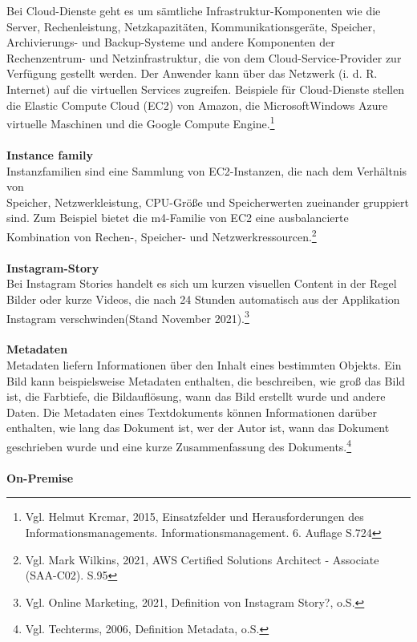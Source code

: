 Bei Cloud-Dienste geht es um sämtliche
Infrastruktur-Komponenten wie die Server, Rechenleistung, Netzkapazitäten, Kommunikationsgeräte, Speicher, Archivierungs- und Backup-Systeme und andere Komponenten der Rechenzentrum- und Netzinfrastruktur, die von dem Cloud-Service-Provider zur Verfügung gestellt werden. Der Anwender kann über das Netzwerk (i. d. R. Internet) auf die virtuellen Services zugreifen. Beispiele für Cloud-Dienste stellen die Elastic Compute Cloud (EC2) von Amazon, die MicrosoftWindows Azure virtuelle Maschinen und die Google Compute Engine.\footnote{Vgl. Helmut Krcmar, 2015, Einsatzfelder und Herausforderungen des Informationsmanagements. Informationsmanagement. 6. Auflage S.724\cite{IM1}}
\\\\
\textbf{Instance family}\\
Instanzfamilien sind eine Sammlung von EC2-Instanzen, die nach dem Verhältnis von\\ Speicher, Netzwerkleistung, CPU-Größe und Speicherwerten zueinander gruppiert sind. Zum Beispiel bietet die m4-Familie von EC2 eine ausbalancierte Kombination von Rechen-, Speicher- und Netzwerkressourcen.\footnote{Vgl. Mark Wilkins, 2021, AWS Certified Solutions Architect - Associate (SAA-C02). S.95\cite{AWS1}}
\\\\
\textbf{Instagram-Story}\\
Bei Instagram Stories handelt es sich um kurzen visuellen Content in der Regel Bilder oder kurze Videos, die nach 24 Stunden automatisch aus der Applikation Instagram verschwinden(Stand November 2021).\footnote{Vgl. Online Marketing, 2021, Definition von Instagram Story?, o.S.\cite{IG2}}
\\\\
\textbf{Metadaten}\\
Metadaten liefern Informationen über den Inhalt eines bestimmten Objekts. Ein Bild kann beispielsweise Metadaten enthalten, die beschreiben, wie groß das Bild ist, die Farbtiefe, die Bildauflösung, wann das Bild erstellt wurde und andere Daten. Die Metadaten eines Textdokuments können Informationen darüber enthalten, wie lang das Dokument ist, wer der Autor ist, wann das Dokument geschrieben wurde und eine kurze Zusammenfassung des Dokuments.\footnote{Vgl. Techterms, 2006, Definition Metadata, o.S.\cite{MET}}
\\\\
\textbf{On-Premise}\\
